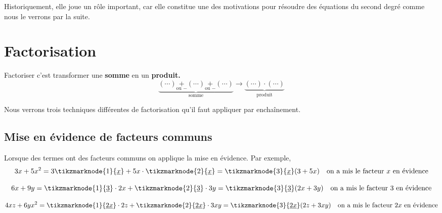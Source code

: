 \documentclass[a4paper,12pt]{report}
\begin{document}
Historiquement, elle joue un rôle important, car elle constitue une des motivations pour résoudre des équations du second degré comme nous le verrons par la suite. 

\section{Factorisation}
\begin{center}
Factoriser c'est transformer une {\bfseries somme} en un {\bfseries produit.}
\[\underbrace{(\cdots)\underset{\text{ou } -}{+}(\cdots)\underset{\text{ou } -}{+}(\cdots)}_{\text{ somme }}\longrightarrow \underbrace{(\cdots)\cdot (\cdots)}_{\text{produit}}\]
\end{center}

Nous verrons trois techniques différentes de factorisation qu'il faut appliquer par enchaînement. 
\subsection{Mise en évidence de facteurs communs}
Lorsque des termes ont des facteurs communs on applique la mise en évidence. Par exemple, 
\[3x+5x^2=3\tikzmarknode{1}{\uline{x}}+5x\cdot \tikzmarknode{2}{\uline{x}}= \tikzmarknode{3}{\uline{x}}(3+5x) \quad \text{on a mis le facteur } x \text{ en évidence}\]
\[6x+9y=\tikzmarknode{1}{\uline{3}}\cdot 2 x + \tikzmarknode{2}{\uline{3}}\cdot 3y= \tikzmarknode{3}{\uline{3}}(2x+3y)\quad \text{on a mis le facteur } 3 \text{ en évidence}
\]
\[
	4xz+6yx^2=\tikzmarknode{1}{\uline{2x}}\cdot 2 z + \tikzmarknode{2}{\uline{2x}}\cdot 3xy= \tikzmarknode{3}{\uline{2x}}(2z+3xy)\quad \text{on a mis le facteur } 2x \text{ en évidence}
\]
\end{document}
